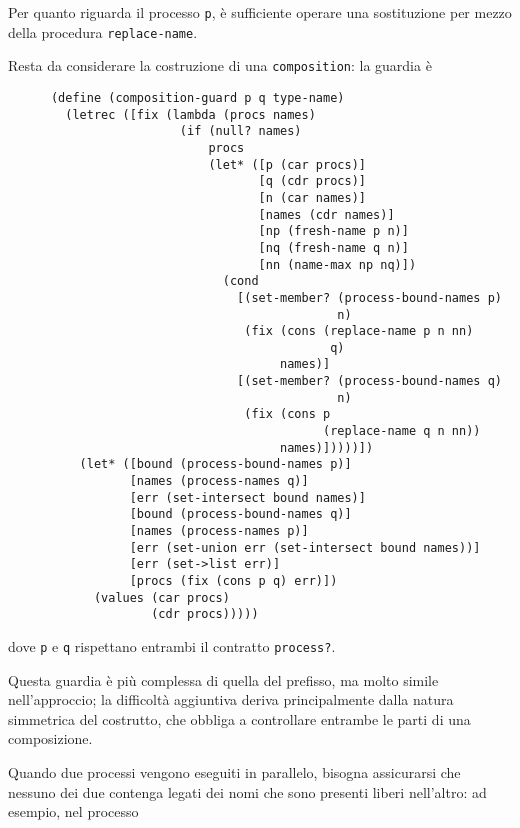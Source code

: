 Per quanto riguarda il processo \lstinline{p}, \`e sufficiente operare una
sostituzione per mezzo della procedura \lstinline{replace-name}.

Resta da considerare la costruzione di una \lstinline{composition}: la
guardia \`e

\begin{lstlisting}
      (define (composition-guard p q type-name)
        (letrec ([fix (lambda (procs names)
                        (if (null? names)
                            procs
                            (let* ([p (car procs)]
                                   [q (cdr procs)]
                                   [n (car names)]
                                   [names (cdr names)]
                                   [np (fresh-name p n)]
                                   [nq (fresh-name q n)]
                                   [nn (name-max np nq)])
                              (cond
                                [(set-member? (process-bound-names p)
                                              n)
                                 (fix (cons (replace-name p n nn)
                                             q)
                                      names)]
                                [(set-member? (process-bound-names q)
                                              n)
                                 (fix (cons p
                                            (replace-name q n nn))
                                      names)]))))])
          (let* ([bound (process-bound-names p)]
                 [names (process-names q)]
                 [err (set-intersect bound names)]
                 [bound (process-bound-names q)]
                 [names (process-names p)]
                 [err (set-union err (set-intersect bound names))]
                 [err (set->list err)]
                 [procs (fix (cons p q) err)])
            (values (car procs)
                    (cdr procs)))))
\end{lstlisting}

dove \lstinline{p} e \lstinline{q} rispettano entrambi il contratto
\lstinline{process?}.

Questa guardia \`e pi\`u complessa di quella del prefisso, ma molto
simile nell'approccio; la difficolt\`a aggiuntiva deriva principalmente
dalla natura simmetrica del costrutto, che obbliga a controllare
entrambe le parti di una composizione.

Quando due processi vengono eseguiti in parallelo, bisogna assicurarsi
che nessuno dei due contenga legati dei nomi che sono presenti liberi
nell'altro: ad esempio, nel processo

